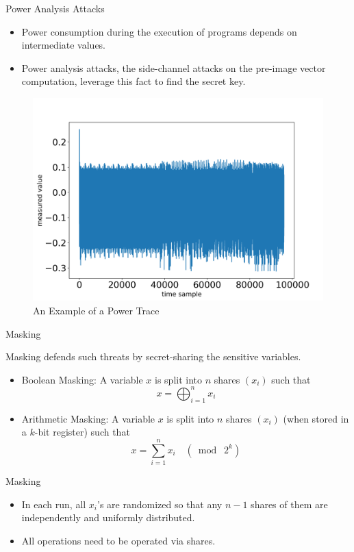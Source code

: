 \begin{frame}{Power Analysis Attacks}

\begin{itemize}
\item Power consumption during the execution of programs depends on intermediate values.
\pause
\item Power analysis attacks, the side-channel attacks on the pre-image vector computation, leverage this fact to find the secret key. 
\pause
\end{itemize}
\vspace{-4pt}
\begin{figure}
\includegraphics[width=.45\textwidth]{Figure/trace_example.png}
\vspace{-5pt}
\caption{An Example of a Power Trace}
\end{figure}

\end{frame}



\begin{frame}{Masking}

Masking defends such threats by secret-sharing the sensitive variables.
\pause
\begin{itemize}
	\item Boolean Masking: A variable $x$ is split into $n$ shares $(x_i)$ such that
	\[
	x = \bigoplus_{i=1}^n x_i
	\]
	\pause
	\item Arithmetic Masking: A variable $x$ is split into $n$ shares $(x_i)$ (when stored in a $k$-bit register) such that
	\[
	x = \sum_{i=1}^n x_i \quad (\bmod\; 2^k)
	\]
\end{itemize}

\end{frame}


\begin{frame}{Masking}

\begin{itemize}
\item In each run, all $x_i$'s are randomized so that any $n-1$ shares of them are independently and uniformly distributed.
\pause
\item All operations need to be operated via shares.
\end{itemize}


\end{frame}


